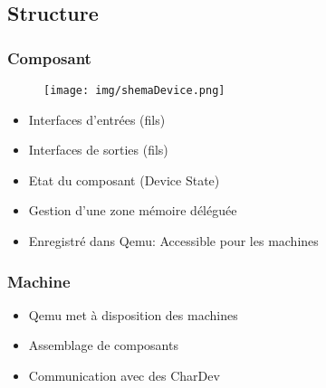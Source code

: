 \documentclass{beamer}
\begin{document}
			
		\subsection{Structure}
			\begin{frame}
				\frametitle{Composant}
				\begin{figure}
					\texttt{[image: img/shemaDevice.png]}
				\end{figure}
				\begin{itemize}
					\item Interfaces d'entrées (fils)
					\item Interfaces de sorties (fils)
					\item Etat du composant (Device State)
					\item Gestion d'une zone mémoire déléguée
					\item Enregistré dans Qemu: Accessible pour les machines
				\end{itemize}
			\end{frame}
			
			\begin{frame}
				\frametitle{Machine}
				\begin{itemize}
					\item Qemu met à disposition des machines
					\item Assemblage de composants
					\item Communication avec des CharDev
				\end{itemize}
			\end{frame}
			
\end{document}
